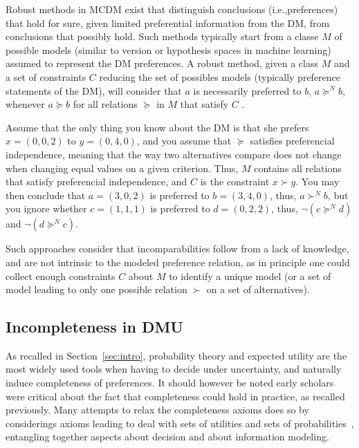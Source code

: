 \documentclass[french, english]{llncs}
\begin{document}
	Robust methods in MCDM exist that distinguish conclusions (i.e.,preferences) that hold for sure, given limited preferential information from the \ac{DM}, from conclusions that possibly hold. Such methods typically start from a classe $M$ of possible models (similar to version or hypothesis spaces in machine learning) assumed to represent the \ac{DM} preferences. A robust method, given a class $M$ and a set of constraints $C$ reducing the set of possibles models (typically preference statements of the \ac{DM}), will consider that $a$ is necessarily preferred to $b$, $a \succeq^N b$, whenever $a \succeq b$ for all relations $\succeq$ in $M$ that satisfy $C$ \citep{greco_ordinal_2008}.
	\begin{example} Assume that the only thing you know about the \ac{DM} is that she prefers $x = (0, 0, 2)$ to $y = (0, 4, 0)$, and you assume that $\succeq$ satisfies preferencial independence, meaning that the way two alternatives compare does not change when changing equal values on a given criterion. Thus, $M$ contains all relations that satisfy preferencial independence, and $C$ is the constraint $x \succ y$. You may then conclude that $a = (3, 0, 2)$ is preferred to $b = (3, 4, 0)$, thus, $a \succ^N b$, but you ignore whether $c = (1, 1, 1)$ is preferred to $d = (0, 2, 2)$, thus, $¬(c \succeq^N d)$ and $¬(d \succeq^N c)$.
	\end{example} 
Such approaches consider that incomparabilities follow from a lack of knowledge, and are not intrinsic to the modeled preference relation, as in principle one could collect enough constraints $C$ about $M$ to identify a unique model (or a set of model leading to only one possible relation $\succ$ on a set of alternatives).
	
	\subsection{Incompleteness in DMU}
	
	As recalled in Section~\ref{sec:intro}, probability theory and expected utility are the most widely used tools when having to decide under uncertainty, and naturally induce completeness of preferences. It should however be noted early scholars were critical about the fact that completeness could hold in practice, as recalled previously. Many attempts to relax the completeness axioms does so by considerings axioms leading to deal with sets of utilities and sets of probabilities~\cite{aumann_utility_1962}, entangling together aspects about decision and about information modeling. 
	
\end{document}
